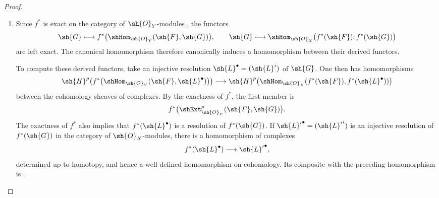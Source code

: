 \begin{proof}
\begin{enumerate}
  \item[\rm(i)]
  Since $f^*$ is exact on the category of $\sh{O}_Y$-modules
  , the functors
  \[
    \sh{G}\longmapsto
      f^*\bigl(\shHom_{\sh{O}_Y}(\sh{F},\sh{G})\bigr),
    \qquad
    \sh{G}\longmapsto
      \shHom_{\sh{O}_X}\bigl(f^*(\sh{F}),f^*(\sh{G})\bigr)
  \]
  are left exact.  The canonical homomorphism
   therefore canonically induces a
  homomorphism between their derived functors.

  To compute these derived functors, take an injective resolution
  $\sh{L}^\bullet=(\sh{L}^i)$ of $\sh{G}$.  One then has
  homomorphisms
  \[
    \begin{aligned}
    \sh{H}^p\!\left(
      f^*\bigl(\shHom_{\sh{O}_Y}
        (\sh{F},\sh{L}^\bullet)\bigr)\right)
    \longrightarrow
    \sh{H}^p\!\left(
      \shHom_{\sh{O}_X}
        (f^*(\sh{F}),f^*(\sh{L}^\bullet))\right)
    \end{aligned}
  \]
  between the cohomology sheaves of complexes.
  By the exactness of $f^*$, the first member is
  \[
    f^*\bigl(\shExt^p_{\sh{O}_Y}(\sh{F},\sh{G})\bigr).
  \]
  The exactness of $f^*$ also implies that
  $f^*(\sh{L}^\bullet)$ is a resolution of $f^*(\sh{G})$.
  If ${\sh{L}'}^\bullet=({\sh{L}'}^i)$ is an injective resolution
  of $f^*(\sh{G})$ in the category of $\sh{O}_X$-modules, there is a
  homomorphism of complexes
  \[
    f^*(\sh{L}^\bullet)\longrightarrow{\sh{L}'}^\bullet,
  \]
  determined up to homotopy, and hence a well-defined homomorphism on
  cohomology.  Its composite with the preceding homomorphism is
  .


\end{enumerate}
\end{proof}
